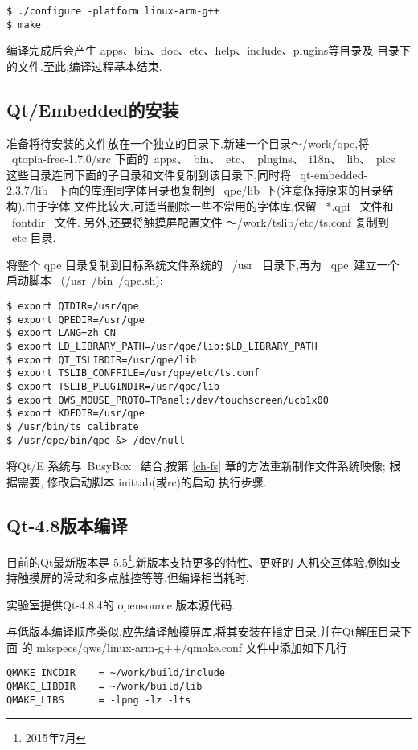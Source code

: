 \begin{boxedminipage}{.9\textwidth}
\begin{verbatim} 
$ ./configure -platform linux-arm-g++
$ make
\end{verbatim}
\end{boxedminipage}

	编译完成后会产生 apps、bin、doc、etc、help、include、plugins等目录及
目录下的文件.至此,编译过程基本结束.

\subsection{Qt/Embedded的安装}
	准备将待安装的文件放在一个独立的目录下.新建一个目录～/work/qpe,将
~qtopia-free-1.7.0/src 下面的~apps、~bin、~etc、~plugins、~i18n、~lib、~pics~
这些目录连同下面的子目录和文件复制到该目录下,同时将 ~qt-embedded-2.3.7/lib~
下面的库连同字体目录也复制到 ~qpe/lib~下(注意保持原来的目录结构).由于字体
文件比较大,可适当删除一些不常用的字体库,保留 ~*.qpf~ 文件和 ~fontdir~ 文件.
另外,还要将触摸屏配置文件 ～/work/tslib/etc/ts.conf 复制到 ~etc 目录.

	将整个 qpe 目录复制到目标系统文件系统的 ~/usr~ 目录下,再为 ~qpe~建立一个
启动脚本 ~(/usr~/bin~/qpe.sh):

\begin{boxedminipage}{.9\textwidth}
\begin{verbatim} 
$ export QTDIR=/usr/qpe
$ export QPEDIR=/usr/qpe
$ export LANG=zh_CN
$ export LD_LIBRARY_PATH=/usr/qpe/lib:$LD_LIBRARY_PATH
$ export QT_TSLIBDIR=/usr/qpe/lib
$ export TSLIB_CONFFILE=/usr/qpe/etc/ts.conf
$ export TSLIB_PLUGINDIR=/usr/qpe/lib
$ export QWS_MOUSE_PROTO=TPanel:/dev/touchscreen/ucb1x00
$ export KDEDIR=/usr/qpe
$ /usr/bin/ts_calibrate
$ /usr/qpe/bin/qpe &> /dev/null
\end{verbatim}
\end{boxedminipage}

	将Qt/E 系统与~BusyBox~ 结合,按第{} \ref{ch-fs}
章的方法重新制作文件系统映像; 根据需要, 修改启动脚本 inittab(或rc)的启动
执行步骤.

\subsection{Qt-4.8版本编译}
目前的Qt最新版本是 5.5\footnote{2015年7月}.新版本支持更多的特性、更好的
人机交互体验,例如支持触摸屏的滑动和多点触控等等.但编译相当耗时.

实验室提供Qt-4.8.4的 opensource 版本源代码.

与低版本编译顺序类似,应先编译触摸屏库,将其安装在指定目录,并在Qt解压目录下面
的 mkspecs/qws/linux-arm-g++/qmake.conf 文件中添加如下几行
\begin{verbatim}
QMAKE_INCDIR    = ~/work/build/include
QMAKE_LIBDIR    = ~/work/build/lib
QMAKE_LIBS      = -lpng -lz -lts
\end{verbatim}

